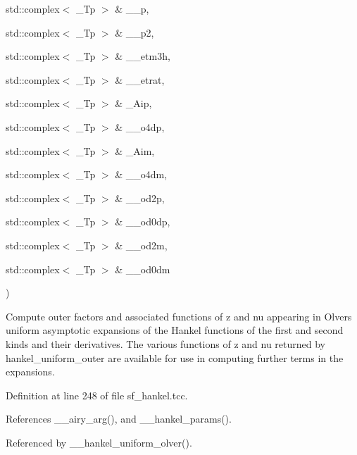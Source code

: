 {\begin{DoxyParamCaption}
\item[{std\+::complex$<$ \+\_\+\+Tp $>$ \&}]{\+\_\+\+\_\+p, }
\item[{std\+::complex$<$ \+\_\+\+Tp $>$ \&}]{\+\_\+\+\_\+p2, }
\item[{std\+::complex$<$ \+\_\+\+Tp $>$ \&}]{\+\_\+\+\_\+etm3h, }
\item[{std\+::complex$<$ \+\_\+\+Tp $>$ \&}]{\+\_\+\+\_\+etrat, }
\item[{std\+::complex$<$ \+\_\+\+Tp $>$ \&}]{\+\_\+\+Aip, }
\item[{std\+::complex$<$ \+\_\+\+Tp $>$ \&}]{\+\_\+\+\_\+o4dp, }
\item[{std\+::complex$<$ \+\_\+\+Tp $>$ \&}]{\+\_\+\+Aim, }
\item[{std\+::complex$<$ \+\_\+\+Tp $>$ \&}]{\+\_\+\+\_\+o4dm, }
\item[{std\+::complex$<$ \+\_\+\+Tp $>$ \&}]{\+\_\+\+\_\+od2p, }
\item[{std\+::complex$<$ \+\_\+\+Tp $>$ \&}]{\+\_\+\+\_\+od0dp, }
\item[{std\+::complex$<$ \+\_\+\+Tp $>$ \&}]{\+\_\+\+\_\+od2m, }
\item[{std\+::complex$<$ \+\_\+\+Tp $>$ \&}]{\+\_\+\+\_\+od0dm}
\end{DoxyParamCaption}
)}\hypertarget{namespacestd_1_1____detail_a099751f2a153283d91f19d6efa52117a}{}\label{namespacestd_1_1____detail_a099751f2a153283d91f19d6efa52117a}


Compute outer factors and associated functions of {\ttfamily z} and {\ttfamily nu} appearing in Olver\textquotesingle{}s uniform asymptotic expansions of the Hankel functions of the first and second kinds and their derivatives. The various functions of z and nu returned by {\ttfamily hankel\+\_\+uniform\+\_\+outer} are available for use in computing further terms in the expansions. 



Definition at line 248 of file sf\+\_\+hankel.\+tcc.



References \+\_\+\+\_\+airy\+\_\+arg(), and \+\_\+\+\_\+hankel\+\_\+params().



Referenced by \+\_\+\+\_\+hankel\+\_\+uniform\+\_\+olver().

